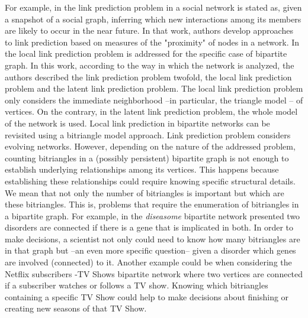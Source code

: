 For example, in \cite{liben2007link} the link prediction problem in a social network is stated as, given a snapshot of a social graph,  inferring which new interactions among its members are likely to occur in the near future. 
In that work, authors develop approaches to link prediction based on measures of the "proximity" of nodes in a network. In \cite{kunegis2010link} the local link prediction problem is addressed for the specific case of bipartite graph. In this work, according to the way in which the network is analyzed, the authors described the link prediction problem twofold, the local link prediction problem and the latent link prediction problem. 
The local link prediction problem only considers the immediate neighborhood --in particular, the triangle model -- of vertices. On the contrary, in the latent link prediction problem, the whole model of the network is used. Local link prediction in bipartite networks can be revisited using a bitriangle model approach. Link prediction problem considers evolving networks. 
However, depending on the nature of the addressed problem, counting bitriangles in a (possibly persistent) bipartite graph is not enough to establish underlying relationships among its vertices. This happens because establishing these relationships could require knowing specific structural details. We mean that not only the number of bitriangles is important but which are these bitriangles. 
This is, problems that require the enumeration of bitriangles in a bipartite graph. For example, in the  \textit{diseasome} bipartite network presented \cite{goh2007human} two disorders are connected if there is a gene that is implicated in both. In order to make decisions, a scientist not only could need to know how many bitriangles are in that graph but --an even more specific question-- given a disorder which genes are involved (connected) to it. 
Another example could be when considering the Netflix subscribers -TV Shows bipartite network where two vertices are connected if a subscriber watches or follows a TV show. Knowing which bitriangles containing a  specific TV Show could help to make decisions about finishing or creating new seasons of that TV Show.

